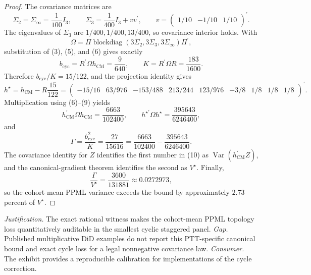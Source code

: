 \documentclass{article}
\begin{document}
\begin{proof}
The covariance matrices are
\[
\Sigma_2=\Sigma_\infty=\frac1{100}I_3,
\qquad
\Sigma_3=\frac1{400}I_3+vv^{\prime},
\qquad
v=\begin{pmatrix}1/10&-1/10&1/10\end{pmatrix}^{\prime}.                \tag{6}
\]
The eigenvalues of \(\Sigma_3\) are
\(1/400,1/400,13/400\), so covariance interior holds.  With
\[
\Omega=\Pi\operatorname{blockdiag}(3\Sigma_2,3\Sigma_3,3\Sigma_\infty)
\Pi^{\prime},                                                           \tag{7}
\]
substitution of (3), (5), and (6) gives exactly
\[
b_{\mathrm{cyc}}=R^{\prime}\Omega h_{\mathrm{CM}}=\frac9{640},
\qquad
K=R^{\prime}\Omega R=\frac{183}{1600}.                                 \tag{8}
\]
Therefore \(b_{\mathrm{cyc}}/K=15/122\), and the projection identity gives
\[
h^{\star}=h_{\mathrm{CM}}-R\frac{15}{122}
=\begin{pmatrix}
-15/16&63/976&-153/488&213/244&123/976&-3/8&1/8&1/8&1/8
\end{pmatrix}^{\prime}.                                                  \tag{9}
\]
Multiplication using (6)--(9) yields
\[
h_{\mathrm{CM}}^{\prime}\Omega h_{\mathrm{CM}}
=\frac{6663}{102400},
\qquad
h^{\star\prime}\Omega h^{\star}
=\frac{395643}{6246400},                                                 \tag{10}
\]
and
\[
\Gamma
=\frac{b_{\mathrm{cyc}}^2}{K}
=\frac{27}{15616}
=\frac{6663}{102400}-\frac{395643}{6246400}.                            \tag{11}
\]
The covariance identity for \(Z\) identifies the first number in (10) as
\(\operatorname{Var}(h_{\mathrm{CM}}^{\prime}Z)\), and the canonical-gradient theorem identifies the second as \(V^{\star}\).  Finally,
\[
\frac{\Gamma}{V^{\star}}=\frac{3600}{131881}\approx0.0272973,
\]
so the cohort-mean PPML variance exceeds the bound by approximately \(2.73\) percent of \(V^{\star}\).
\end{proof}
\par\smallskip\noindent \textit{Justification.} The exact rational witness makes the cohort-mean PPML topology loss quantitatively auditable in the smallest cyclic staggered panel. \textit{Gap.} Published multiplicative DiD examples do not report this PTT-specific canonical bound and exact cycle loss for a legal nonnegative covariance law. \textit{Consumer.} The exhibit provides a reproducible calibration for implementations of the cycle correction.
\end{document}
